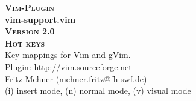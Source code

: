 \documentclass[oneside,10pt,landscape,DIV17]{scrartcl}
\newcommand{\Pluginversion}{2.0}
\begin{document}
%

\begin{multicols}{3}
%
\begin{center}
%
\textbf{\textsc{\small{Vim-Plugin}}}\\
\textbf{\LARGE{vim-support.vim}}\\
\textbf{\textsc{\small{Version \Pluginversion}}}\\
\vspace{5mm}%
\textbf{\textsc{\Huge{Hot keys}}}\\ 
\vspace{5mm}%
Key mappings for Vim and gVim.\\
Plugin: http://vim.sourceforge.net\\
Fritz Mehner (mehner.fritz@fh-swf.de)\\
\vspace{1.0mm}
{\normalsize (i)} insert mode, {\normalsize (n)} normal mode, {\normalsize (v)} visual mode\\
\vspace{4.0mm}


\end{center}
\end{multicols}
\end{document}
